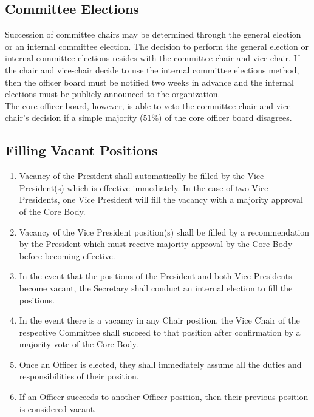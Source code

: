 \documentclass{article}
\newenvironment{li}{
\begin{enumerate}
  \setlength{\itemsep}{1pt}
  \setlength{\parskip}{0pt}
  \setlength{\parsep}{0pt}
}{\end{enumerate}}
\begin{document}
\subsection{Committee Elections}
Succession of committee chairs may be determined through the general election or an internal committee election. The decision to perform the general election or internal committee elections resides with the committee chair and vice-chair. If the chair and vice-chair decide to use the internal committee elections method, then the officer board must be notified two weeks in advance and the internal elections must be publicly announced to the organization. \\

\noindent The core officer board, however, is able to veto the committee chair and vice-chair's decision if a simple majority (51\%) of the core officer board disagrees.

\subsection{Filling Vacant Positions}
\begin{li}
\item Vacancy of the President shall automatically be filled by the Vice President(s) which is effective immediately. In the case of two Vice Presidents, one Vice President will fill the vacancy with a majority approval of the Core Body.
\item Vacancy of the Vice President position(s) shall be filled by a recommendation by the President which must receive majority approval by the Core Body before becoming effective.
\item In the event that the positions of the President and both Vice Presidents become vacant, the Secretary shall conduct an internal election to fill the positions.
\item In the event there is a vacancy in any Chair position, the Vice Chair of the respective Committee shall succeed to that position after confirmation by a majority vote of the Core Body.
\item Once an Officer is elected, they shall immediately assume all the duties and responsibilities of their position.
\item If an Officer succeeds to another Officer position, then their previous position is considered vacant.
\end{li}

\end{document}
